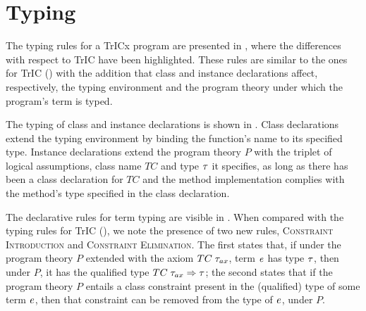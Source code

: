 \section{Typing}
\label{clstyping}
The typing rules for a TrICx program are presented in , where the differences with respect to TrIC have been highlighted. These rules are similar to the ones for TrIC () with the addition that class and instance declarations affect, respectively, the typing environment and the program theory under which the program's term is typed.

The typing of class and instance declarations is shown in . Class declarations extend the typing environment by binding the function's name to its specified type. Instance declarations extend the program theory $P$ with the triplet of logical assumptions, class name $TC$ and type $\mathit{\tau}$ it specifies, as long as there has been a class declaration for $TC$ and the method implementation complies with the method's type specified in the class declaration.

The declarative rules for term typing are visible in . When compared with the typing rules for TrIC (), we note the presence of two new rules, \textsc{Constraint Introduction} and \textsc{Constraint Elimination}. The first states that, if under the program theory $P$ extended with the axiom $TC \;\mathit{\tau}_{ax}$, term $\mathit{e}$ has type $\mathit{\tau}$, then under $P$, it has the qualified type $TC\;\mathit{\tau}_{ax} \Rightarrow \mathit{\tau}$; the second states that if the program theory $P$ entails a class constraint present in the (qualified) type of some term $\mathit{e}$, then that constraint can be removed from the type of $\mathit{e}$, under $P$.


